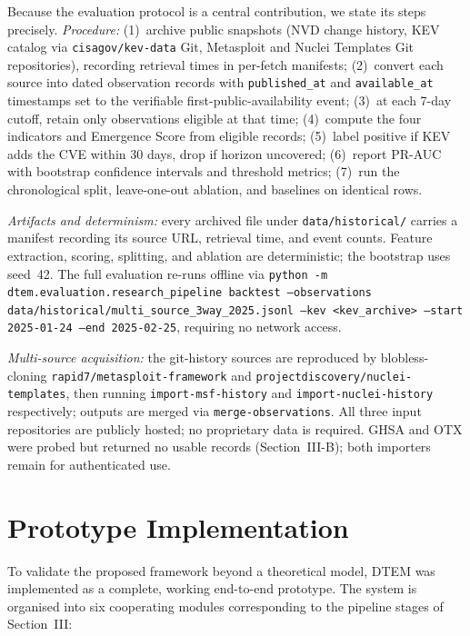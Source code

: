 \documentclass[conference]{IEEEtran}
\begin{document}
Because the evaluation protocol is a central contribution, we state its steps precisely. \textit{Procedure:} (1)~archive public snapshots (NVD change history, KEV catalog via \texttt{cisagov/kev-data} Git, Metasploit and Nuclei Templates Git repositories), recording retrieval times in per-fetch manifests; (2)~convert each source into dated observation records with \texttt{published\_at} and \texttt{available\_at} timestamps set to the verifiable first-public-availability event; (3)~at each 7-day cutoff, retain only observations eligible at that time; (4)~compute the four indicators and Emergence Score from eligible records; (5)~label positive if KEV adds the CVE within 30 days, drop if horizon uncovered; (6)~report PR-AUC with bootstrap confidence intervals and threshold metrics; (7)~run the chronological split, leave-one-out ablation, and baselines on identical rows.

\textit{Artifacts and determinism:} every archived file under \texttt{data/historical/} carries a manifest recording its source URL, retrieval time, and event counts. Feature extraction, scoring, splitting, and ablation are deterministic; the bootstrap uses seed~42. The full evaluation re-runs offline via \texttt{python -m dtem.evaluation.research\_pipeline backtest --observations data/historical/multi\_source\_3way\_2025.jsonl --kev <kev\_archive> --start 2025-01-24 --end 2025-02-25}, requiring no network access.

\textit{Multi-source acquisition:} the git-history sources are reproduced by blobless-cloning \texttt{rapid7/metasploit-framework} and \texttt{projectdiscovery/nuclei-templates}, then running \texttt{import-msf-history} and \texttt{import-nuclei-history} respectively; outputs are merged via \texttt{merge-observations}. All three input repositories are publicly hosted; no proprietary data is required. GHSA and OTX were probed but returned no usable records (Section~III-B); both importers remain for authenticated use.

\section{Prototype Implementation}

To validate the proposed framework beyond a theoretical model, DTEM was implemented as a complete, working end-to-end prototype. The system is organised into six cooperating modules corresponding to the pipeline stages of Section~III:
\end{document}
